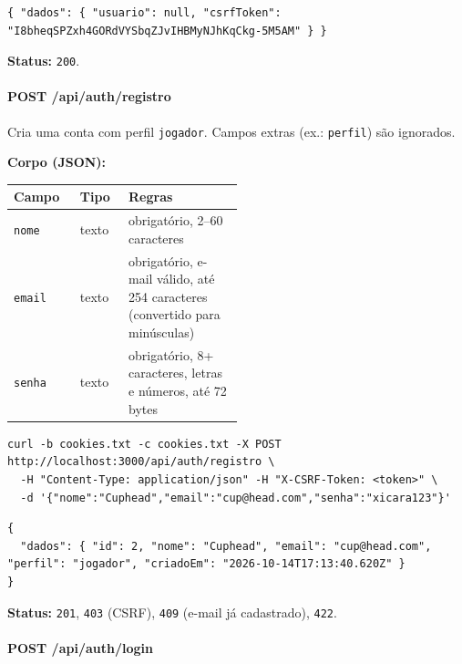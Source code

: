 \begin{Verbatim}[breaklines,breakanywhere,fontsize=\scriptsize]
{ "dados": { "usuario": null, "csrfToken": "I8bheqSPZxh4GORdVYSbqZJvIHBMyNJhKqCkg-5M5AM" } }
\end{Verbatim}

\textbf{Status:} \texttt{200}.

\hypertarget{post-apiauthregistro}{%
\paragraph{POST /api/auth/registro}\label{post-apiauthregistro}}

Cria uma conta com perfil \texttt{jogador}. Campos extras (ex.:
\texttt{perfil}) são ignorados.

\textbf{Corpo (JSON):}

\begin{longtable}[]{@{}llp{0.5\linewidth}@{}}
\toprule\noalign{}
Campo & Tipo & Regras \\
\midrule\noalign{}
\endhead
\bottomrule\noalign{}
\endlastfoot
\texttt{nome} & texto & obrigatório, 2--60 caracteres \\
\texttt{email} & texto & obrigatório, e-mail válido, até 254 caracteres
(convertido para minúsculas) \\
\texttt{senha} & texto & obrigatório, 8+ caracteres, letras e números,
até 72 bytes \\
\end{longtable}

\begin{Verbatim}[breaklines,breakanywhere,fontsize=\scriptsize]
curl -b cookies.txt -c cookies.txt -X POST http://localhost:3000/api/auth/registro \
  -H "Content-Type: application/json" -H "X-CSRF-Token: <token>" \
  -d '{"nome":"Cuphead","email":"cup@head.com","senha":"xicara123"}'
\end{Verbatim}

\begin{Verbatim}[breaklines,breakanywhere,fontsize=\scriptsize]
{
  "dados": { "id": 2, "nome": "Cuphead", "email": "cup@head.com", "perfil": "jogador", "criadoEm": "2026-10-14T17:13:40.620Z" }
}
\end{Verbatim}

\textbf{Status:} \texttt{201}, \texttt{403} (CSRF), \texttt{409} (e-mail
já cadastrado), \texttt{422}.

\hypertarget{post-apiauthlogin}{%
\paragraph{POST /api/auth/login}\label{post-apiauthlogin}}

